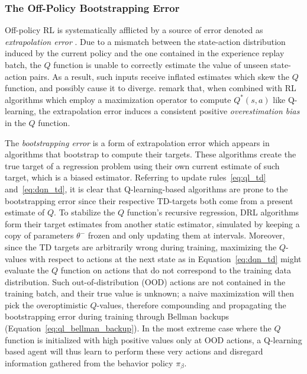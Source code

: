 \subsubsection{The Off-Policy Bootstrapping Error}\label{sec:BE}
Off-policy RL is systematically afflicted by a source of error denoted
as \textit{extrapolation error} \citep{pmlr-v97-fujimoto19a}. Due to a
mismatch between the state-action distribution induced by the current
policy and the one contained in the experience replay batch, the $Q$
function is unable
to correctly estimate the value of unseen state-action pairs. As a
result, such inputs receive inflated estimates which
skew the $Q$ function, and possibly cause it to
diverge. \citet{pmlr-v97-fujimoto19a} remark that, when combined with
RL algorithms which employ a maximization operator to compute
$Q^*\left(s,a\right)$ like Q-learning, the extrapolation error
induces a consistent positive \textit{overestimation bias}
\citep{thrun1993issues} in the $Q$ function.

The \textit{bootstrapping error} \citep{kumar2019stabilizing} is a
form of
extrapolation error which appears in algorithms that bootstrap to
compute their targets. These algorithms create the true target of a
regression problem using their own current estimate of such target,
which is a biased estimator. Referring to update rules~\ref{eq:ql_td}
and~\ref{eq:dqn_td}, it is clear that Q-learning-based algorithms are
prone to the bootstrapping error since their respective TD-targets
both come from a present estimate of $Q$. To stabilize the $Q$
function's recursive regression, DRL algorithms form their target
estimates from another static estimator, simulated by keeping a copy
of parameters $\theta^-$ frozen and only updating them at intervals.
Moreover, since the TD targets are arbitrarily wrong during training,
maximizing the $Q$-values with respect to actions at the next state as
in Equation~\ref{eq:dqn_td} might
evaluate the $Q$ function on actions that do not correspond to the
training data distribution. Such out-of-distribution (OOD)
actions \citep{kumar2019stabilizing} are not contained in the training
batch, and their true value is unknown; a naive maximization will then
pick the overoptimistic $Q$-values, therefore compounding and
propagating the bootstrapping error during training through Bellman
backups (Equation~\ref{eq:ql_bellman_backup}). In the most extreme
case where the $Q$ function is initialized with high positive values
only at OOD actions, a Q-learning based agent will thus learn to
perform these very actions and disregard information gathered from the
behavior policy $\pi_\beta$.

